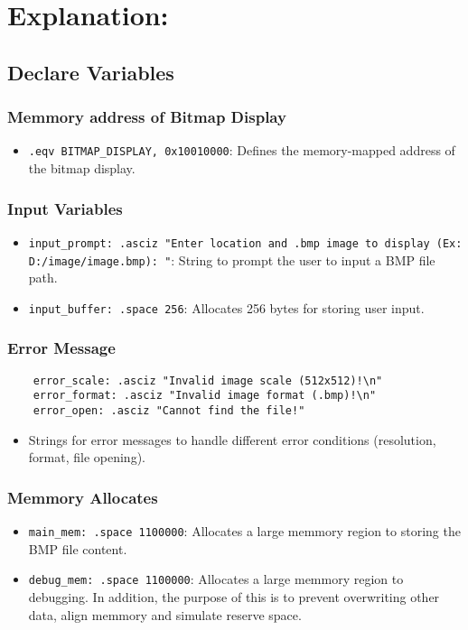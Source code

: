 \documentclass{article}
\begin{document}
\section{Explanation:}
\subsection{Declare Variables}
\subsubsection{Memmory address of Bitmap Display}
\begin{itemize}
    \item \texttt{.eqv BITMAP_DISPLAY, 0x10010000}: Defines the memory-mapped address of the bitmap display.
\end{itemize}
\subsubsection{Input Variables}
\begin{itemize}
    \item \texttt{input_prompt: .asciz "Enter location and .bmp image to display (Ex: D:/image/image.bmp): "}: String to prompt the user to input a BMP file path.
    \item \texttt{input_buffer: .space 256}: Allocates 256 bytes for storing user input.
\end{itemize}
\subsubsection{Error Message}
\begin{verbatim}
    error_scale: .asciz "Invalid image scale (512x512)!\n"
    error_format: .asciz "Invalid image format (.bmp)!\n"
    error_open: .asciz "Cannot find the file!"
\end{verbatim}    
\begin{itemize}
    \item Strings for error messages to handle different error conditions (resolution, format, file opening).
\end{itemize}
\subsubsection{Memmory Allocates}
\begin{itemize}
    \item \texttt{main_mem: .space 1100000}: Allocates a large memmory region to storing the BMP file content.
    \item \texttt{debug_mem: .space 1100000}: Allocates a large memmory region to debugging. In addition, the purpose of this is to prevent overwriting other data, align memmory and simulate reserve space.
\end{itemize}
\end{document}
